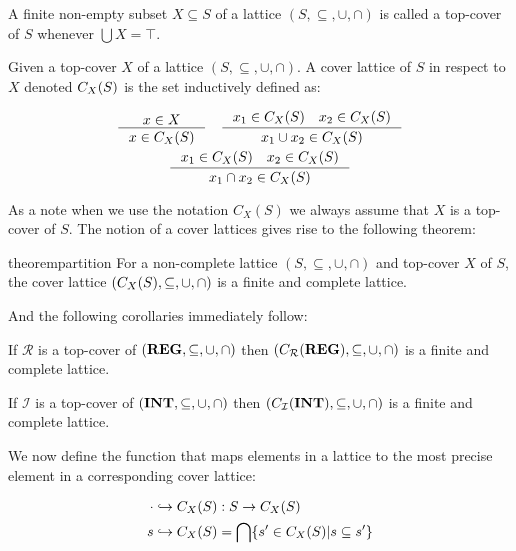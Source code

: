 \begin{definition}
    A finite non-empty subset $X \subseteq S$ of a lattice $(S, \subseteq, \cup, \cap)$ is called a top-cover of $S$ whenever $\bigcup X = \top$.
\end{definition}

\begin{definition}\label{def:coverlattice}
Given a top-cover $X$ of a lattice $(S, \subseteq, \cup, \cap)$.
A cover lattice of $S$ in respect to $X$ denoted $C_{X}(S)$ is the set inductively defined as:

\begin{gather*}
    \inference{x \in X}{x \in C_X(S)} \quad
    \inference{x_1 \in C_X(S) \quad x_2 \in C_X(S)}{x_1 \cup  x_2 \in C_X(S)}\\
    \inference{x_1 \in C_X(S) \quad x_2 \in C_X(S)}{x_1 \cap  x_2 \in C_X(S)}
\end{gather*}
\end{definition}

As a note when we use the notation $C_X(S)$ we always assume that $X$ is a top-cover of $S$.
The notion of a cover lattices gives rise to the following theorem:

\begin{restatable}{theorem}{partition}\label{thm:partition}
For a non-complete lattice $(S, \subseteq, \cup, \cap)$ and top-cover $X$ of $S$, the cover lattice $(C_{X}(S), \subseteq, \cup, \cap)$ is a finite and complete lattice.
\end{restatable}

And the following corollaries immediately follow:

\begin{corollary}\label{co:topcoverr}
    If $\mathcal{R}$ is a top-cover of $(\mathbf{REG}, \subseteq, \cup, \cap)$ then $(C_{\mathcal{R}}(\mathbf{REG}), \subseteq, \cup, \cap)$ is a finite and complete lattice.
\end{corollary}

\begin{corollary}\label{co:topcoveri}
    If $\mathcal{I}$ is a top-cover of $(\mathbf{INT}, \subseteq, \cup, \cap)$ then $(C_{\mathcal{I}}(\mathbf{INT}), \subseteq, \cup, \cap)$ is a finite and complete lattice.
\end{corollary}

We now define the function that maps elements in a lattice to the most precise element in a corresponding cover lattice:

\begin{align}
    \cdot \hookrightarrow C_X(S) &: S\rightarrow C_X(S) \\
    s \hookrightarrow C_X(S) &= \bigcap\{s' \in C_X(S)|s \subseteq s'\}
\end{align}

